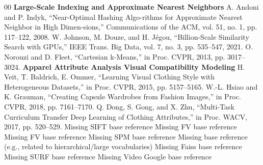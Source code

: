 \documentclass[conference]{IEEEtran}
\begin{document}
\begin{thebibliography}{00}
\textbf{Large-Scale Indexing and Approximate Nearest Neighbors}
 A. Andoni and P. Indyk, “Near-Optimal Hashing Algo-rithms for Approximate Nearest Neighbor in High Dimen-sions,” Communications of the ACM, vol. 51, no. 1, pp. 117–122, 2008.
 W. Johnson, M. Douze, and H. Jégou, “Billion-Scale Similarity Search with GPUs,” IEEE Trans. Big Data, vol. 7, no. 3, pp. 535–547, 2021.
 O. Norouzi and D. Fleet, “Cartesian k-Means,” in Proc. CVPR, 2013, pp. 3017–3024.
\textbf{Apparel Attribute Analysis Visual Compatibility Modeling}
 H. Veit, T. Baldrich, E. Ommer, “Learning Visual Clothing Style with Heterogeneous Datasets,” in Proc. CVPR, 2015, pp. 5157–5165.
 W.-L. Hsiao and K. Grauman, “Creating Capsule Wardrobes from Fashion Images,” in Proc. CVPR, 2018, pp. 7161–7170.
 Q. Dong, S. Gong, and X. Zhu, “Multi-Task Curriculum Transfer Deep Learning of Clothing Attributes,” in Proc. WACV, 2017, pp. 520–529.
 Missing SIFT base reference
 Missing FV base reference
 Missing FV base reference
 Missing SPM base reference
 Missing base reference (e.g., related to hierarchical/large vocabularies)
 Missing Faiss base reference
 Missing SURF base reference
 Missing Video Google base reference
\end{thebibliography}
\end{document}
